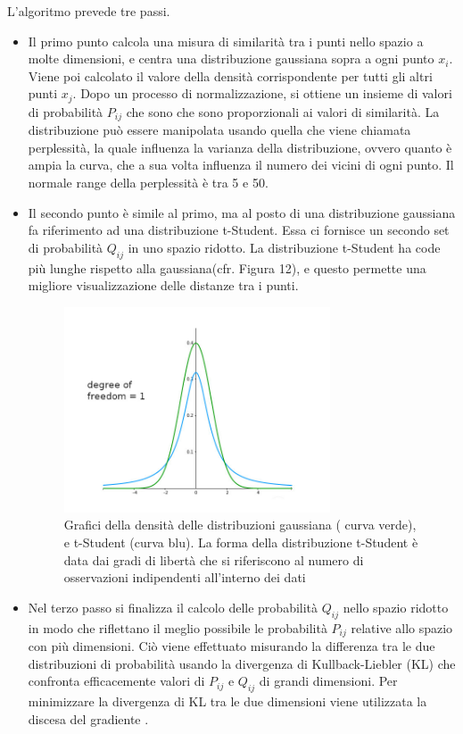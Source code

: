 \documentclass[12pt,italian]{report}
\begin{document}
L'algoritmo prevede tre passi.
\begin{itemize}
	\item Il primo punto calcola una misura di similarità tra i punti nello spazio a molte dimensioni, e centra una distribuzione gaussiana sopra a ogni punto $x_i$. Viene poi calcolato il valore della densità corrispondente per tutti gli altri punti $x_j$. Dopo un processo di normalizzazione, si ottiene un insieme di valori di probabilità $P_{ij}$ che sono che sono proporzionali ai valori di similarità. La distribuzione può essere manipolata usando quella che viene chiamata perplessità, la quale influenza la varianza della distribuzione, ovvero quanto è ampia la curva, che a sua volta influenza  il numero dei vicini di ogni punto. Il normale range della perplessità è tra 5 e 50.
	\item Il secondo punto è simile al primo, ma al posto di una distribuzione gaussiana fa riferimento ad una distribuzione t-Student. Essa ci fornisce un secondo set di probabilità $Q_{ij}$ in uno spazio ridotto. La distribuzione t-Student ha code più lunghe rispetto alla gaussiana(cfr. Figura 12), e questo permette una migliore visualizzazione delle distanze tra i punti.
	
	\begin{figure}[h]
		\centering
		\includegraphics[width = 79mm]{immagini/t-dist1}
		\caption{Grafici della densità delle distribuzioni gaussiana ( curva verde), e t-Student (curva blu). La forma della distribuzione t-Student è data dai gradi di libertà che si riferiscono al numero di osservazioni indipendenti all'interno dei dati}
	\end{figure}
	\item Nel terzo passo si finalizza il calcolo delle probabilità $Q_{ij}$ nello spazio ridotto in modo che riflettano il meglio possibile le probabilità $P_{ij}$ relative allo spazio con più dimensioni. Ciò viene effettuato misurando la differenza tra le due distribuzioni di probabilità usando la divergenza di Kullback-Liebler (KL) che confronta efficacemente valori di $P_{ij}$ e $Q_{ij}$ di grandi dimensioni. Per minimizzare la divergenza di KL tra le due dimensioni viene utilizzata la discesa del gradiente \cite{t-SNE}.
\end{itemize}
\end{document}
